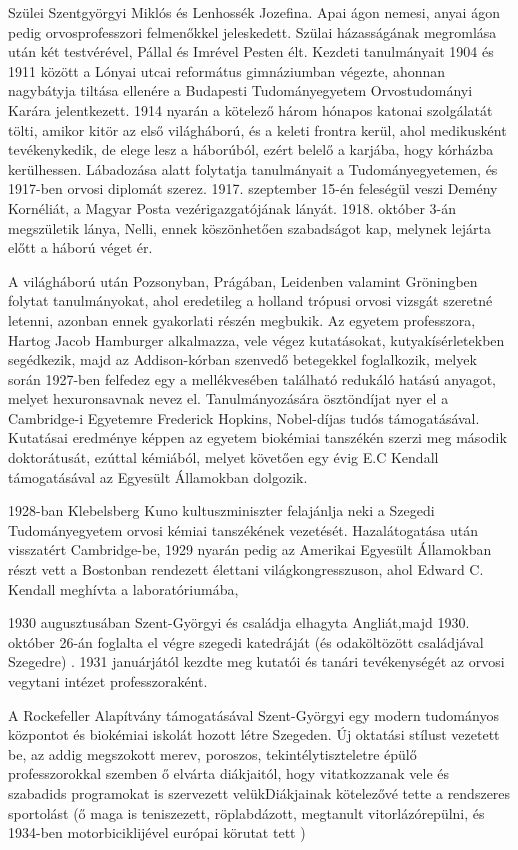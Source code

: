 \documentclass[10pt, conference,a4paper]{ITKproc}
\begin{document}
Szülei Szentgyörgyi Miklós és Lenhossék Jozefina. Apai ágon nemesi, anyai ágon pedig orvosprofesszori felmenőkkel jeleskedett. Szülai házasságának megromlása után két testvérével, Pállal és Imrével Pesten élt.
Kezdeti tanulmányait 1904 és 1911 között a Lónyai utcai református gimnáziumban végezte, ahonnan nagybátyja tiltása ellenére a Budapesti Tudományegyetem Orvostudományi Karára jelentkezett.
1914 nyarán a kötelező három hónapos katonai szolgálatát tölti, amikor kitör az első világháború, és a keleti frontra kerül, ahol medikusként tevékenykedik, de elege lesz a háborúból, ezért belelő a karjába, hogy kórházba kerülhessen. Lábadozása alatt folytatja tanulmányait a Tudományegyetemen, és 1917-ben orvosi diplomát szerez.  
1917. szeptember 15-én feleségül veszi Demény Kornéliát, a Magyar Posta vezérigazgatójának lányát. 1918. október 3-án megszületik lánya, Nelli, ennek köszönhetően szabadságot kap, melynek lejárta előtt a háború véget ér.


 A világháború után Pozsonyban, Prágában, Leidenben valamint Gröningben folytat tanulmányokat, ahol eredetileg a holland trópusi orvosi vizsgát szeretné letenni, azonban ennek gyakorlati részén megbukik. Az egyetem professzora, Hartog Jacob Hamburger alkalmazza, vele végez kutatásokat, kutyakísérletekben segédkezik, majd az Addison-kórban szenvedő betegekkel foglalkozik, melyek során 1927-ben felfedez egy a mellékvesében található redukáló hatású anyagot, melyet hexuronsavnak nevez el. Tanulmányozására ösztöndíjat nyer el a Cambridge-i Egyetemre Frederick Hopkins, Nobel-díjas tudós támogatásával. Kutatásai eredménye képpen az egyetem biokémiai tanszékén szerzi meg második doktorátusát, ezúttal kémiából, melyet követően egy évig E.C Kendall támogatásával az Egyesült Államokban dolgozik.

1928-ban Klebelsberg Kuno kultuszminiszter felajánlja neki a Szegedi Tudományegyetem orvosi kémiai tanszékének vezetését.
Hazalátogatása után visszatért Cambridge-be, 1929 nyarán pedig az Amerikai Egyesült Államokban részt vett a Bostonban rendezett élettani világkongresszuson, ahol  Edward C. Kendall meghívta a laboratóriumába, 

1930 augusztusában Szent-Györgyi és családja elhagyta Angliát,majd 1930. október 26-án foglalta el végre szegedi katedráját (és odaköltözött családjával Szegedre) .   1931 januárjától kezdte meg kutatói és tanári tevékenységét az orvosi vegytani intézet professzoraként.

A Rockefeller Alapítvány támogatásával Szent-Györgyi egy modern tudományos központot és biokémiai iskolát hozott létre Szegeden. 
Új oktatási stílust vezetett be, az addig megszokott merev, poroszos, tekintélytiszteletre épülő professzorokkal szemben ő elvárta diákjaitól, hogy vitatkozzanak vele és szabadids programokat is szervezett velükDiákjainak kötelezővé tette a rendszeres sportolást (ő maga is teniszezett, röplabdázott, megtanult vitorlázórepülni, és 1934-ben motorbiciklijével európai körutat tett )
\end{document}
